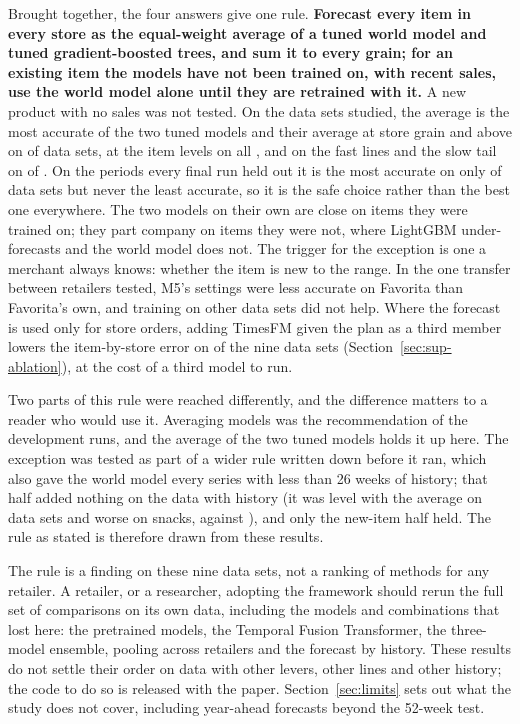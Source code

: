 Brought together, the four answers give one rule. \textbf{Forecast every item in
every store as the equal-weight average of a tuned world model and tuned
gradient-boosted trees, and sum it to every grain; for an existing item the models
have not been trained on, with recent sales, use the world model alone until they are
retrained with it.} A new product with no sales was not tested. On the data sets studied, the average is the most accurate of the two tuned
models and their average at store grain and above on \rqAvgBestCoarseWord{} of \rqNineWord{} data sets, at the item levels on all \rqAvgBestItemWord{}, and
on the fast lines and the slow tail on \rqAvgBestFast{} of \rqNineWord{}. On the periods every final run held out it is
the most accurate on only \hoAvgBest{} of \hoSets{} data sets but never the least accurate, so it is the safe choice
rather than the best one everywhere. The two models on their own
are close on items they were trained on; they part company on items they were
not, where LightGBM under-forecasts and the world model does not. The trigger
for the exception is one a merchant always knows: whether the item is new to the
range. In the one transfer between retailers tested, M5's settings were
less accurate on Favorita than Favorita's own, and training on other data sets did not help. Where the forecast is used only for store
orders, adding TimesFM given the plan as a third member lowers the item-by-store
error on \ptThreeBelowAvg{} of the nine data sets (Section~\ref{sec:sup-ablation}), at the cost of
a third model to run.

Two parts of this rule were reached differently, and the difference matters to
a reader who would use it. Averaging models was the recommendation of the \ifjournal development runs\else\firstver{}\fi{}, and the average of the two tuned models holds it up here. The
exception was tested as part of a wider rule written down before it ran, which
also gave the world model every series with less than 26 weeks of history; that
half added nothing on the data with history (it was level with the average on
\rqRuleLevel{} data sets and worse on snacks, \rqRuleSna{} against \rqSnaAvg{}), and only the new-item half held. The rule
as stated is therefore drawn from these results.

The rule is a finding on these nine data sets, not a ranking of methods for any
retailer. A retailer, or a researcher, adopting the framework should rerun the
full set of comparisons on its own data, including the models and combinations
that lost here: the pretrained models, the Temporal Fusion Transformer, the
three-model ensemble, pooling across retailers and the forecast by history. These
results do not settle their order on data with other levers, other lines and
other history; the
code to do so is released with the paper. Section~\ref{sec:limits} sets out what
the study does not cover, including year-ahead forecasts beyond the 52-week test.



